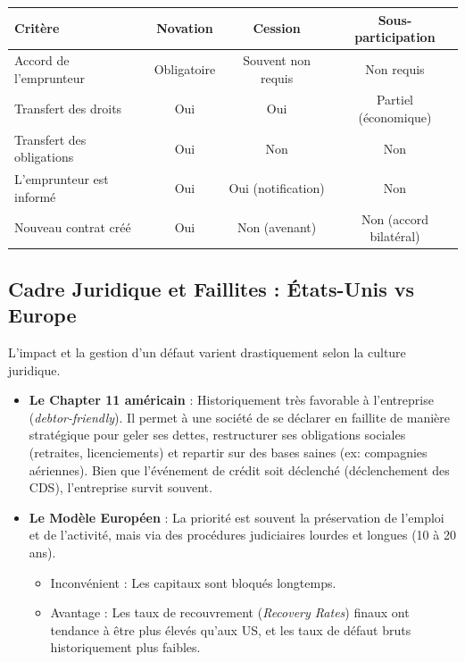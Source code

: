 \begin{center}
\renewcommand{\arraystretch}{1.2}
\begin{tabular}{|l|c|c|c|}
\hline
\textbf{Critère} & \textbf{Novation} & \textbf{Cession} & \textbf{Sous-participation} \\
\hline
Accord de l'emprunteur & Obligatoire & Souvent non requis & Non requis \\
\hline
Transfert des droits & Oui & Oui & Partiel (économique) \\
\hline
Transfert des obligations & Oui & Non & Non \\
\hline
L'emprunteur est informé & Oui & Oui (notification) & Non \\
\hline
Nouveau contrat créé & Oui & Non (avenant) & Non (accord bilatéral) \\
\hline
\end{tabular}
\end{center}

\subsection{Cadre Juridique et Faillites : États-Unis vs Europe}
L'impact et la gestion d'un défaut varient drastiquement selon la culture juridique.

\begin{itemize}
    \item \textbf{Le Chapter 11 américain} : Historiquement très favorable à l'entreprise (\textit{debtor-friendly}). Il permet à une société de se déclarer en faillite de manière stratégique pour geler ses dettes, restructurer ses obligations sociales (retraites, licenciements) et repartir sur des bases saines (ex: compagnies aériennes). Bien que l'événement de crédit soit déclenché (déclenchement des CDS), l'entreprise survit souvent.
    \item \textbf{Le Modèle Européen} : La priorité est souvent la préservation de l'emploi et de l'activité, mais via des procédures judiciaires lourdes et longues (10 à 20 ans). 
    \begin{itemize}
        \item Inconvénient : Les capitaux sont bloqués longtemps.
        \item Avantage : Les taux de recouvrement (\textit{Recovery Rates}) finaux ont tendance à être plus élevés qu'aux US, et les taux de défaut bruts historiquement plus faibles.
    \end{itemize}
\end{itemize}

